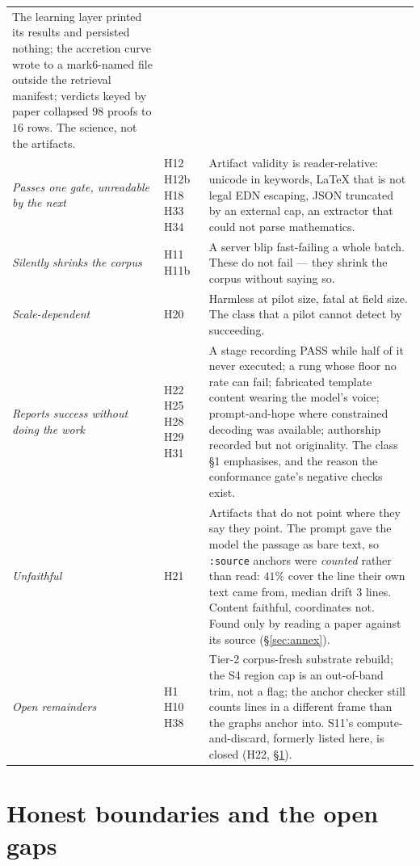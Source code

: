 \documentclass[11pt]{article}
\newcommand{\hz}[1]{\textsf{#1}}
\begin{document}
{\begin{longtable}{p{} p{} p{}}
The learning layer printed its results and persisted nothing; the accretion
curve wrote to a mark6-named file outside the retrieval manifest; verdicts
keyed by paper collapsed $98$ proofs to $16$ rows. The science, not the
artifacts.\\[3pt]
\emph{Passes one gate, unreadable by the next} &
\hz{H12} \hz{H12b} \hz{H18} \hz{H33} \hz{H34} &
Artifact validity is reader-relative: unicode in keywords, \LaTeX{} that is
not legal EDN escaping, JSON truncated by an external cap, an extractor that
could not parse mathematics.\\[3pt]
\emph{Silently shrinks the corpus} &
\hz{H11} \hz{H11b} &
A server blip fast-failing a whole batch. These do not fail --- they shrink
the corpus without saying so.\\[3pt]
\emph{Scale-dependent} &
\hz{H20} &
Harmless at pilot size, fatal at field size. The class that a pilot cannot
detect by succeeding.\\[3pt]
\emph{Reports success without doing the work} &
\hz{H22} \hz{H25} \hz{H28} \hz{H29} \hz{H31} &
A stage recording PASS while half of it never executed; a rung whose floor no
rate can fail; fabricated template content wearing the model's voice;
prompt-and-hope where constrained decoding was available; authorship recorded
but not originality. The class \S1 emphasises, and the reason the conformance
gate's negative checks exist.\\[3pt]
\emph{Unfaithful} &
\hz{H21} &
Artifacts that do not point where they say they point. The prompt gave the
model the passage as bare text, so \texttt{:source} anchors were \emph{counted}
rather than read: $41\%$ cover the line their own text came from, median drift
$3$ lines. Content faithful, coordinates not. Found only by reading a paper
against its source (\S\ref{sec:annex}).\\[3pt]
\emph{Open remainders} &
\hz{H1} \hz{H10} \hz{H38} &
Tier-2 corpus-fresh substrate rebuild; the S4 region cap is an out-of-band
trim, not a flag; the anchor checker still counts lines in a different frame
than the graphs anchor into. \hz{S11}'s compute-and-discard, formerly listed
here, is closed (\hz{H22}, \S\ref{sec:open}).\\
\end{longtable}
}

\section{Honest boundaries and the open gaps}
\label{sec:open}
\end{document}
